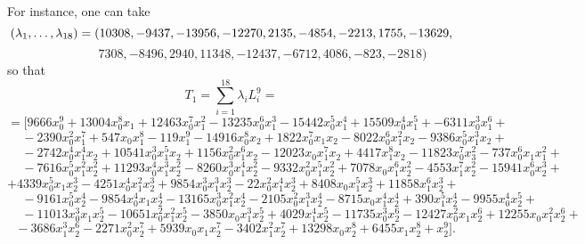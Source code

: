 \documentclass{amsart}
\theoremstyle{definition}
\begin{document}
For instance, one can take {\small{$$ (\lambda_{1},\ldots, \lambda_{18}) = \\
(10308,-9437,-13956,-12270,2135, -4854,-2213,1755,-13629,$$
$$\quad\quad\quad\quad\quad 7308,-8496, 2940,11348,-12437,-6712,4086,-823,-2818)$$}}
so that
$$ T_{1} = \sum_{i=1}^{18}\lambda_{i} L_{i}^{9} = $$
{\small{$$ =[9666x_0^9+13004x_0^8x_1+12463x_0^7x_1^2-13235x_0^6x_1^3 -15442x_0^5x_1^4+15509x_0^4x_1^5+
 -6311x_0^3x_1^6+$$
$$ \,\,\,\,\,\,\, -2390x_0^2x_1^7+547x_0x_1^8-119x_1^9-14916x_0^8x_2+1822x_0^7x_1x_2-8022x_0^6x_1^2x_2-9386x_0^5x_1^3x_2+$$
$$\,\,\,\,\,\,\,-2742x_0^4x_1^4x_2 +10541x_0^3x_1^5x_2 +1156x_0^2x_1^6x_2 -12023x_0x_1^7x_2
+ 4417 x_1^8x_2-11823x_0^7x_3^2 -737x_0^6x_1x_1^2+$$
$$\,\,\,\,\,\,\,-7616x_0^5x_1^2x_2^2+11293 x_0^4x_1^3x_2^2 -8260x_0^3x_1^4x_2^2-9332x_0^2x_1^5x_2^2 +7078x_0x_1^6x_2^2-4553x_1^7x_2^2-15941x_0^6x_2^3+$$
$$  +4339x_0^5x_1x_2^3-4251x_0^4x_1^2x_2^3+ 9854x_0^3x_1^3x_2^3 -22x_0^2x_1^4x_2^3 + 8408x_0x_1^5x_2^3 +11858x_1^6x_2^3+ $$
 $$ \,\,\,\,\,\,\,-9161x_0^5x_2^4-9854x_0^4x_1x_2^4 -13165x_0^3x_1^2x_2^4 -2105x_0^2x_1^3x_2^4 -8715x_0x_1^4x_2^4 +390x_1^5x_2^4 -9955x_0^4x_2^5+$$
$$\,\,\,\,\,\,\, -11013x_0^3x_1x_2^5 -10651x_0^2x_1^2x_2^5 -3850x_0x_1^3x_2^5+4029x_1^4x_2^5-11735x_0^3x_2^6 -12427x_0^2x_1x_2^6+ 12255x_0x_1^2x_2^6 +$$
$$\,\,\,\,-3686x_1^3x_2^6-2271x_0^2x_2^7+5939x_0x_1x_2^7-3402x_1^2x_2^7 +13298x_0x_2^8+6455x_1x_2^8+x_2^9].\quad\quad  $$}}
\end{document}
